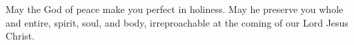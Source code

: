 \lettrine[loversize=0.15,lines=2]{M}{}ay the God of peace make you perfect in holiness. May he preserve you whole and entire, spirit, soul, and body, irreproachable at the coming of our Lord Jesus Christ.
